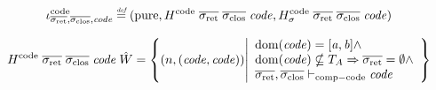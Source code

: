 \documentclass[a4paper]{article}
\begin{document}

\[
  \codereg{\sigrets,\sigcloss,\code} \defeq (\pure,H^\mathrm{code} \; \sigrets \; \sigcloss \; \code,H^\mathrm{code}_\sigma \; \sigrets \; \sigcloss \; \code)
\]

\begin{equation*}
  H^\mathrm{code} \; \sigrets \; \sigcloss \; \code \; \hat{W} = \left\{\npair{(\code,\code)} \middle|
    \begin{array}{l}
    \dom(\code) = [\aaddr,\baddr] \wedge \\
    \dom(\code) \nsubseteq \ta \Rightarrow \sigrets = \emptyset \wedge \\
    \sigrets,\sigcloss \vdash_{\mathrm{comp-code}} \code 
    \end{array}
  \right\}
\end{equation*}
\end{document}
